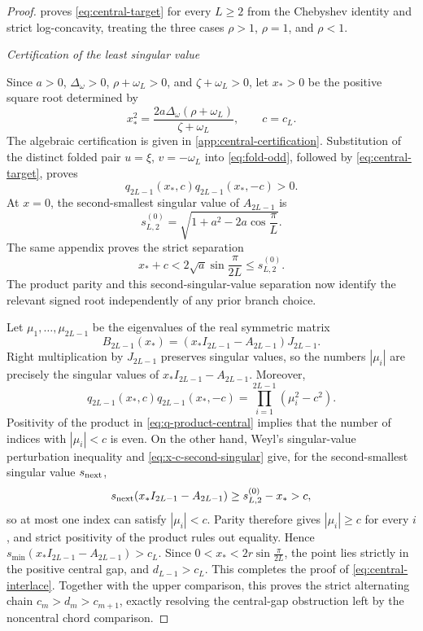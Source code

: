 \documentclass[a4paper,preprint,12pt,nopreprintline,sort&compress]{elsarticle}
\numberwithin{equation}{section}
\theoremstyle{remark}
\newcommand{\proofstage}[1]{%
  \par\medskip\noindent\textit{#1}\par\nobreak\smallskip}
\begin{document}
\begin{proof}
 proves \eqref{eq:central-target} for every
\(L\geq2\) from the Chebyshev identity and strict log-concavity, treating
the three cases \(\rho>1\), \(\rho=1\), and \(\rho<1\).

\proofstage{Certification of the least singular value}
Since \(a>0\), \(\Delta_\omega>0\), \(\rho+\omega_L>0\), and
\(\zeta+\omega_L>0\), let \(x_*>0\) be the positive square root determined
by
\begin{equation}\label{eq:x-star-central}
 x_*^2=\frac{2a\Delta_\omega(\rho+\omega_L)}{\zeta+\omega_L},
 \qquad c=c_L.
\end{equation}
The algebraic certification is given in
\cref{app:central-certification}.  Substitution of the distinct folded pair
\(u=\xi\), \(v=-\omega_L\) into \eqref{eq:fold-odd}, followed by
\eqref{eq:central-target}, proves
\begin{equation}\label{eq:q-product-central}
 q_{2L-1}(x_*,c)q_{2L-1}(x_*,-c)>0.
\end{equation}
At \(x=0\), the second-smallest singular value of \(A_{2L-1}\) is
\[
 s_{L,2}^{(0)}
 =\sqrt{1+a^2-2a\cos\frac{\pi}{L}}.
\]
The same appendix proves the strict separation
\begin{equation}\label{eq:x-c-second-singular}
 x_*+c<2\sqrt a\sin\frac{\pi}{2L}\leq s_{L,2}^{(0)}.
\end{equation}
The product parity and this second-singular-value separation now identify
the relevant signed root independently of any prior branch choice.

Let \(\mu_1,\ldots,\mu_{2L-1}\) be the eigenvalues of the real symmetric
matrix
\[
 B_{2L-1}(x_*)=(x_*I_{2L-1}-A_{2L-1})J_{2L-1}.
\]
Right multiplication by \(J_{2L-1}\) preserves singular values, so the
numbers \(|\mu_i|\) are precisely the singular values of
\(x_*I_{2L-1}-A_{2L-1}\).  Moreover,
\[
 q_{2L-1}(x_*,c)q_{2L-1}(x_*,-c)
 =\prod_{i=1}^{2L-1}(\mu_i^2-c^2).
\]
Positivity of the product in \eqref{eq:q-product-central} implies that the
number of indices with \(|\mu_i|<c\) is even.  On the other hand, Weyl's
singular-value perturbation inequality and
\eqref{eq:x-c-second-singular} give, for the second-smallest singular value
\(s_{\rm next}\),
\[
 s_{\rm next}(x_*I_{2L-1}-A_{2L-1})
 \geq s_{L,2}^{(0)}-x_*>c,
\]
so at most one index can satisfy \(|\mu_i|<c\).  Parity therefore gives
\(|\mu_i|\geq c\) for every \(i\), and strict positivity of the product
rules out equality.  Hence
\(s_{\min}(x_*I_{2L-1}-A_{2L-1})>c_L\).  Since
\(0<x_*<2r\sin\frac{\pi}{2L}\), the point lies strictly in the positive
central gap, and \(d_{L-1}>c_L\).  This completes the proof of
\eqref{eq:central-interlace}.
Together with the upper comparison, this proves the strict alternating
chain \(c_m>d_m>c_{m+1}\), exactly resolving the central-gap obstruction
left by the noncentral chord comparison.
\end{proof}
\end{document}
